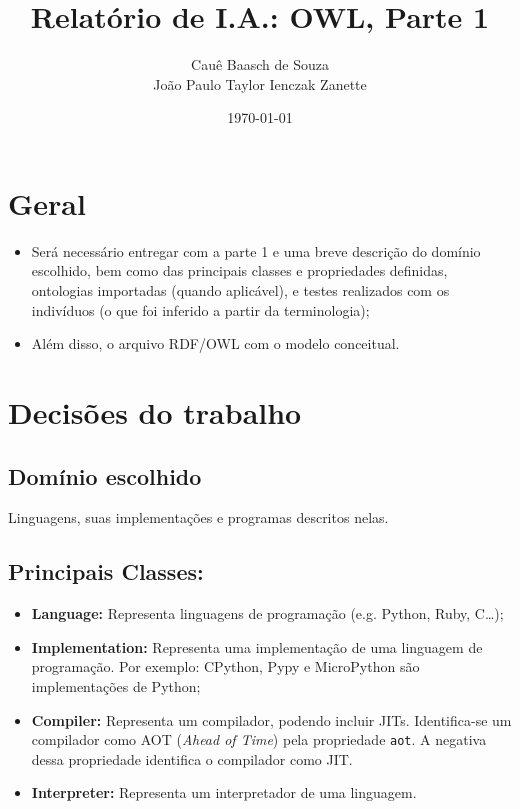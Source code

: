 \documentclass[answers]{exam}
\title{Relatório de I.A.: OWL, Parte 1}
\author{Cauê Baasch de Souza \\
        João Paulo Taylor Ienczak Zanette}
\date{\today}
\begin{document}
    \maketitle{}

    \section{Geral}

    \begin{superframe}
        \begin{itemize}
            \item Será necessário entregar com a parte 1 e uma breve descrição
                do domínio escolhido, bem como das principais classes e
                propriedades definidas, ontologias importadas (quando
                aplicável), e testes realizados com os indivíduos (o que foi
                inferido a partir da terminologia);

            \item Além disso, o arquivo RDF/OWL com o modelo conceitual.
        \end{itemize}
    \end{superframe}

    \section{Decisões do trabalho}

    \subsection{Domínio escolhido}

    Linguagens, suas implementações e programas descritos nelas.

    \subsection{Principais Classes:}

    \begin{itemize}
        \item \textbf{Language:} Representa linguagens de programação (e.g.
            Python, Ruby, C\ldots);
        \item \textbf{Implementation:} Representa uma implementação de uma
            linguagem de programação. Por exemplo: CPython, Pypy e MicroPython
            são implementações de Python;
        \item \textbf{Compiler:} Representa um compilador, podendo incluir
            JITs. Identifica-se um compilador como AOT (\textit{Ahead of Time})
            pela propriedade \texttt{aot}. A negativa dessa propriedade
            identifica o compilador como JIT\@.
        \item \textbf{Interpreter:} Representa um interpretador de uma
            linguagem.
    \end{itemize}
\end{document}
